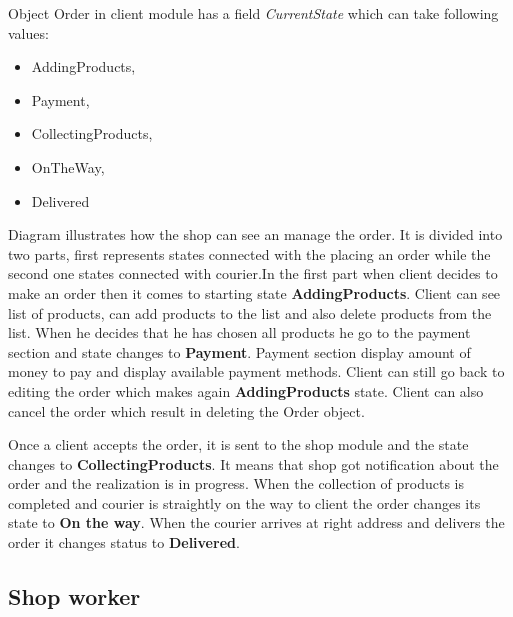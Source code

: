 \documentclass[../main.tex]{subfiles}
\begin{document}
Object Order in client module has a field \textit{CurrentState} which can take following values:

\begin{itemize}
\item AddingProducts,
\item Payment,
\item CollectingProducts,
\item OnTheWay,
\item Delivered
\end{itemize}
\vspace{5mm}
Diagram illustrates how the shop can see an manage the order. It is divided into two parts, first represents states connected with the placing an order while the second one states connected with courier.In the first part when client decides to make an order then it comes to starting state \textbf{AddingProducts}. Client can see list of products, can add products to the list and also delete products from the list. When he decides that he has chosen all products he go to the payment section and state changes to \textbf{Payment}. Payment section display amount of money to pay and display available payment methods. Client can still go back to editing the order which makes again \textbf{AddingProducts} state. Client can also cancel the order which result in deleting the Order object.

Once a client accepts the order, it is sent to the shop module and the state changes to \textbf{CollectingProducts}. It means that shop got notification about the order and the realization is in progress. When the collection of products is completed and courier is straightly on the way to client the order changes its state to \textbf{On the way}. When the courier arrives at right address and delivers the order it changes status to \textbf{Delivered}.

\subsection{Shop worker}
\vspace{5mm}
\end{document}
